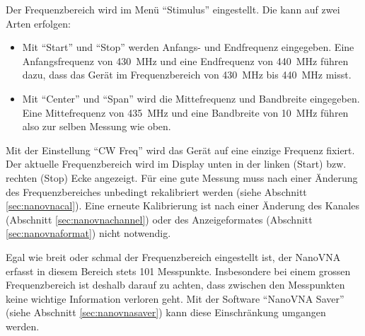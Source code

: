 \documentclass[twoside,a4paper,11pt,halfparskip,DIV=11,notitlepage]{scrartcl}
\begin{document}
Der Frequenzbereich wird im Menü ``Stimulus'' eingestellt. Die kann auf zwei
Arten erfolgen:

\begin{itemize}
    \item Mit ``Start'' und ``Stop'' werden Anfangs- und Endfrequenz eingegeben. Eine Anfangsfrequenz von
        430~MHz und eine Endfrequenz von 440~MHz führen dazu, dass das  Gerät im Frequenzbereich von 430~MHz bis 440~MHz misst.
    \item Mit ``Center'' und ``Span'' wird die Mittefrequenz und Bandbreite eingegeben. Eine Mittefrequenz von 435~MHz
        und eine Bandbreite von 10~MHz führen also zur selben Messung wie oben.
\end{itemize}

Mit der Einstellung ``CW Freq'' wird das Gerät auf eine einzige Frequenz fixiert.
Der aktuelle Frequenzbereich wird im Display unten in der linken (Start) bzw.
rechten (Stop) Ecke angezeigt.
Für eine gute Messung muss nach einer Änderung des Frequenzbereiches unbedingt
rekalibriert werden (siehe Abschnitt \ref{sec:nanovnacal}). Eine erneute Kalibrierung
ist nach einer Änderung des Kanales (Abschnitt \ref{sec:nanovnachannel}) oder
des Anzeigeformates (Abschnitt \ref{sec:nanovnaformat}) nicht notwendig.

Egal wie breit oder schmal der Frequenzbereich eingestellt ist, der NanoVNA erfasst in diesem Bereich stets
101 Messpunkte. Insbesondere bei einem grossen Frequenzbereich ist deshalb darauf zu achten, dass zwischen
den Messpunkten keine wichtige Information verloren geht. Mit der Software
``NanoVNA Saver'' (siehe Abschnitt \ref{sec:nanovnasaver}) kann diese Einschränkung umgangen werden.
\end{document}
